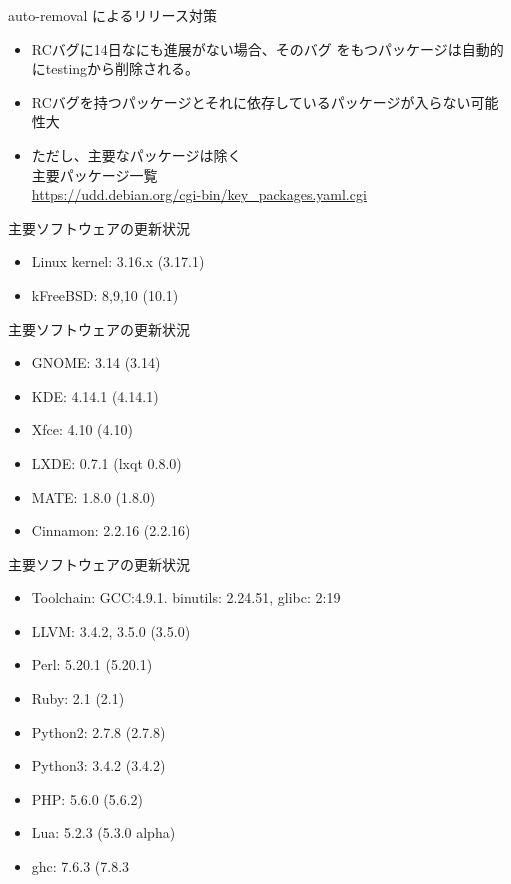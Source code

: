 \begin{frame}{auto-removal によるリリース対策}
\begin{itemize}
\item RCバグに14日なにも進展がない場合、そのバグ
をもつパッケージは自動的にtestingから削除される。
\item RCバグを持つパッケージとそれに依存しているパッケージが入らない可能性大
\item ただし、主要なパッケージは除く \\
主要パッケージ一覧\\
\url{https://udd.debian.org/cgi-bin/key_packages.yaml.cgi}
\end{itemize}
\end{frame}

\begin{frame}{主要ソフトウェアの更新状況}

\begin{itemize}
\item Linux kernel: 3.16.x (3.17.1)
\item kFreeBSD: 8,9,10 (10.1)
\end{itemize}

\end{frame}

\begin{frame}{主要ソフトウェアの更新状況}
\begin{itemize}
\item GNOME: 3.14 (3.14)
\item KDE: 4.14.1 (4.14.1)
\item Xfce: 4.10 (4.10)
\item LXDE: 0.7.1 (lxqt 0.8.0)
\item MATE: 1.8.0 (1.8.0)
\item Cinnamon: 2.2.16 (2.2.16)
\end{itemize}
\end{frame}

\begin{frame}{主要ソフトウェアの更新状況}
\begin{itemize}
\item Toolchain: GCC:4.9.1. binutils: 2.24.51, glibc: 2:19
\item LLVM: 3.4.2, 3.5.0 (3.5.0)
\item Perl: 5.20.1 (5.20.1)
\item Ruby: 2.1 (2.1)
\item Python2: 2.7.8 (2.7.8)
\item Python3: 3.4.2 (3.4.2)
\item PHP: 5.6.0 (5.6.2)
\item Lua: 5.2.3 (5.3.0 alpha)
\item ghc: 7.6.3 (7.8.3
\end{itemize}
\end{frame}

